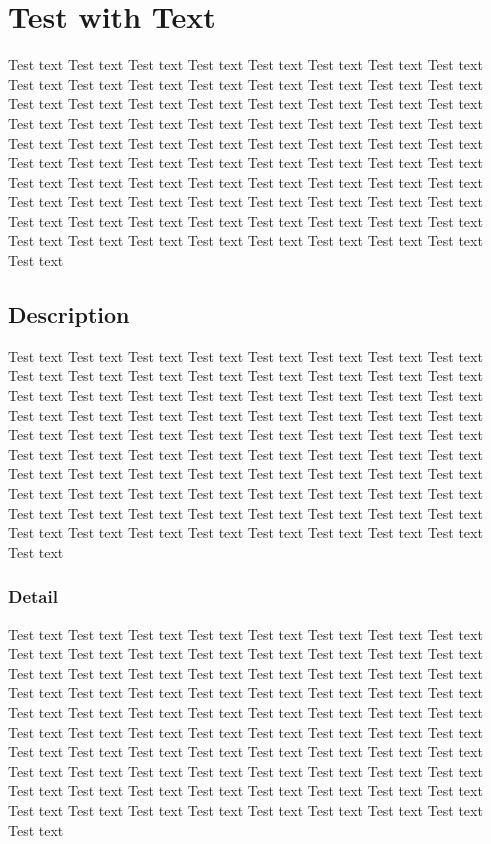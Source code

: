 \chapter{Test with Text}
Test text Test text Test text Test text Test text Test text Test text Test text Test text Test text Test text Test text Test text Test text Test text Test text Test text Test text Test text Test text Test text Test text Test text Test text Test text Test text Test text Test text Test text Test text Test text Test text Test text Test text Test text Test text Test text Test text Test text Test text Test text Test text Test text Test text Test text Test text Test text Test text Test text Test text Test text Test text Test text Test text Test text Test text Test text Test text Test text Test text Test text Test text Test text Test text Test text Test text Test text Test text Test text Test text Test text Test text Test text Test text Test text Test text Test text Test text Test text Test text Test text 
\section{Description}
	Test text Test text Test text Test text Test text Test text Test text Test text Test text Test text Test text Test text Test text Test text Test text Test text Test text Test text Test text Test text Test text Test text Test text Test text Test text Test text Test text Test text Test text Test text Test text Test text Test text Test text Test text Test text Test text Test text Test text Test text Test text Test text Test text Test text Test text Test text Test text Test text Test text Test text Test text Test text Test text Test text Test text Test text Test text Test text Test text Test text Test text Test text Test text Test text Test text Test text Test text Test text Test text Test text Test text Test text Test text Test text Test text Test text Test text Test text Test text Test text Test text 
\subsection{Detail}
	Test text Test text Test text Test text Test text Test text Test text Test text Test text Test text Test text Test text Test text Test text Test text Test text Test text Test text Test text Test text Test text Test text Test text Test text Test text Test text Test text Test text Test text Test text Test text Test text Test text Test text Test text Test text Test text Test text Test text Test text Test text Test text Test text Test text Test text Test text Test text Test text Test text Test text Test text Test text Test text Test text Test text Test text Test text Test text Test text Test text Test text Test text Test text Test text Test text Test text Test text Test text Test text Test text Test text Test text Test text Test text Test text Test text Test text Test text Test text Test text Test text 
